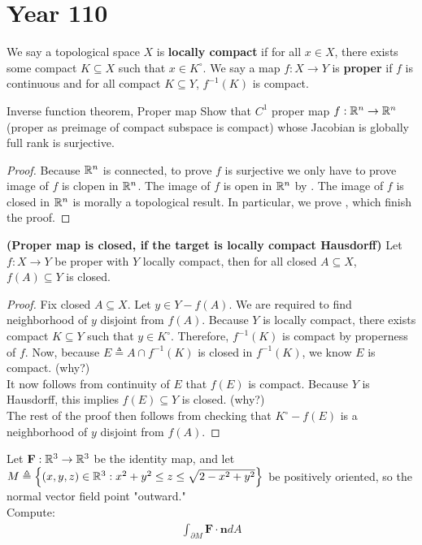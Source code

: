 \documentclass{report}
\begin{document}
\section{Year 110}
We say a topological space $X$ is \textbf{locally compact} if for all $x \in X$, there exists some compact $K \subseteq X$ such that $x \in K^{\circ }$. We say a map $f:X\rightarrow Y$ is \textbf{proper} if $f$ is continuous and for all compact $K\subseteq Y$, $f^{-1}(K)$ is compact.
\begin{question}{Inverse function theorem, Proper map}{}
  Show that $C^1$ proper map  $f:\mathbb{R}^n\rightarrow \mathbb{R}^n$ (proper as preimage of compact subspace is compact) whose Jacobian is globally full rank is surjective. 
\end{question}
\begin{proof}
  Because $\mathbb{R}^n$ is connected,  to prove $f$ is surjective we only have to prove image of $f$ is clopen in $\mathbb{R}^n$. The image of $f$ is open in $\mathbb{R}^n$ by . The image of $f$ is closed in $\mathbb{R}^n$ is morally a topological result. In particular, we prove  , which finish the proof.
\end{proof}
\begin{theorem}
\label{THpmic}
\textbf{(Proper map is closed, if the target is locally compact Hausdorff)} Let $f:X\rightarrow Y$ be proper with $Y$ locally compact, then for all closed $A \subseteq X$, $f(A)\subseteq Y$ is closed.
\end{theorem}
\begin{proof}
Fix closed $A\subseteq X$. Let $y \in Y- f(A)$. We are required to find neighborhood of $y$ disjoint from $f(A)$. Because $Y$ is locally compact, there exists compact $K \subseteq Y$ such that $y \in K^{\circ }$. Therefore, $f^{-1}(K)$ is compact by properness of $f$. Now, because $E \triangleq A \cap f^{-1}(K)$ is closed in $f^{-1}(K)$, we know $E$ is compact.  (why?)  \\

It now follows from continuity of  $E$ that $f(E)$ is compact. Because $Y$ is Hausdorff, this implies $f(E)\subseteq Y$ is closed. (why?) \\

The rest of the proof then follows from checking that $K^{\circ }-f(E)$ is a neighborhood of $y$ disjoint from $f(A)$. 
\end{proof}
\begin{question}{}{}
Let $\textbf{F}:\mathbb{R}^3 \rightarrow \mathbb{R}^3$ be the identity map, and let $M\triangleq \left\{ (x,y,z)\in\mathbb{R}^3: x^2+y^2 \leq z \leq \sqrt{2-x^2+y^2} \right\}$ be positively oriented, so the normal vector field point "outward."\\

Compute:
\begin{align*}
\int_{\partial M} \textbf{F} \cdot \textbf{n} dA
\end{align*}
\end{question}
\end{document}
